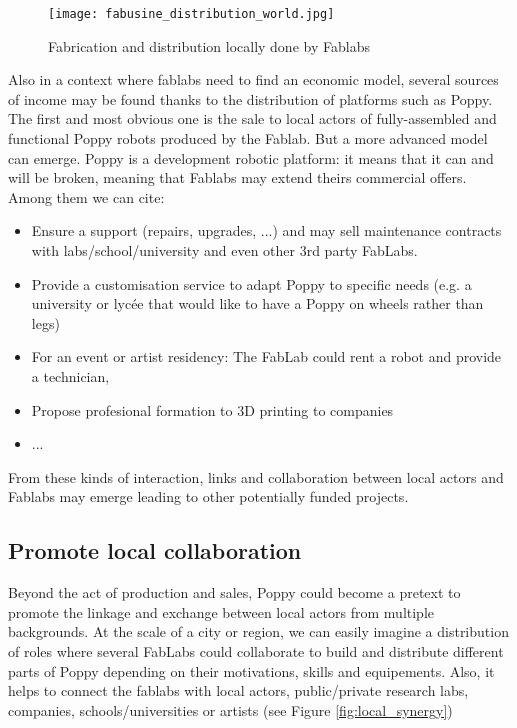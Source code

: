 \begin{figure}[tb]
    \begin{center}
        \texttt{[image: fabusine\_distribution\_world.jpg]}
    \end{center}
    \caption{Fabrication and distribution locally done by Fablabs}
    \label{fig:world_fab}
\end{figure}


Also in a context where fablabs need to find an economic model, several sources of income may be found thanks to the distribution of platforms such as Poppy. The first and most obvious one is the sale to local actors of fully-assembled and functional Poppy robots produced by the Fablab. But a more advanced model can emerge. Poppy is a development robotic platform: it means that it can and will be broken, meaning that Fablabs may extend theirs commercial offers. Among them we can cite:

\begin{itemize}
    \item Ensure a support (repairs, upgrades, ...) and may sell maintenance contracts with labs/school/university and even other 3rd party FabLabs.
    \item Provide a customisation service to adapt Poppy to specific needs (e.g. a university or lycée that would like to have a Poppy on wheels rather than legs)
    \item For an event or artist residency: The FabLab could rent a robot and provide a technician,
    \item Propose profesional formation to 3D printing to companies
    \item ...
\end{itemize}

From these kinds of interaction, links and collaboration between local actors and Fablabs may emerge leading to other potentially funded projects.

\subsection{Promote local collaboration} %

Beyond the act of production and sales, Poppy could become a pretext to promote the linkage and exchange between local actors from multiple backgrounds. At the scale of a city or region, we can easily imagine a distribution of roles where several FabLabs could collaborate to build and distribute different parts of Poppy depending on their motivations, skills and equipements.
Also, it helps to connect the fablabs with local actors, public/private research labs, companies, schools/universities or artists (see Figure \ref{fig:local_synergy})

